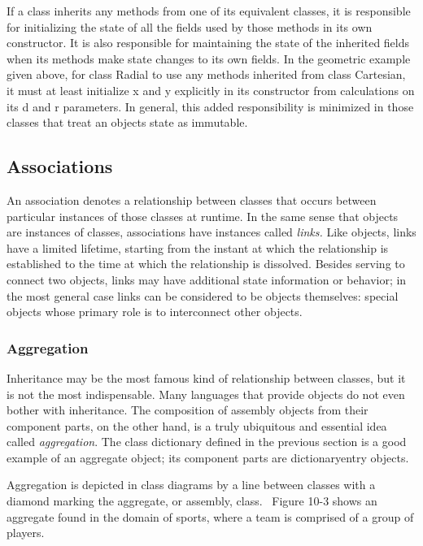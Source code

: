 If a class inherits any methods from one of its equivalent classes, it
is responsible for initializing the state of all the fields used by
those methods in its own constructor. It is also responsible for
maintaining the state of the inherited fields when its methods make
state changes to its own fields. In the geometric example given above,
for class \textsf{Radial} to use any methods inherited from class
\textsf{Cartesian}, it must at least initialize \textsf{x} and
\textsf{y} explicitly in its constructor from calculations on its
\textsf{d} and \textsf{r} parameters. In general, this added
responsibility is minimized in those classes that treat an
object{\textquotesingle}s state as immutable.

\subsection{Associations}
An association denotes a relationship between classes
that occurs between particular instances of those classes at runtime.
In the same sense that objects are instances of classes, associations
have instances called \textit{links.}
Like objects, links have a limited lifetime, starting from the instant
at which the relationship is established to the time at which the
relationship is dissolved. Besides serving to connect two objects,
links may have additional state information or behavior; in the most
general case links can be considered to be objects themselves: special
objects whose primary role is to interconnect other objects.

\subsubsection{Aggregation}
Inheritance may be the most famous kind of relationship between classes,
but it is not the most indispensable. Many languages that provide
objects do not even bother with inheritance. The composition of
assembly objects from their component parts, on the other hand, is a
truly ubiquitous and essential idea called
\textit{aggregation}. The class \textsf{dictionary}
defined in the previous section is a good example of an aggregate
object; its component parts are \textsf{dictionaryentry} objects.

Aggregation is depicted in class diagrams by a line between classes with
a diamond marking the aggregate, or assembly, class. \ Figure 10-3
shows an aggregate found in the domain of sports, where a team is
comprised of a group of players.

